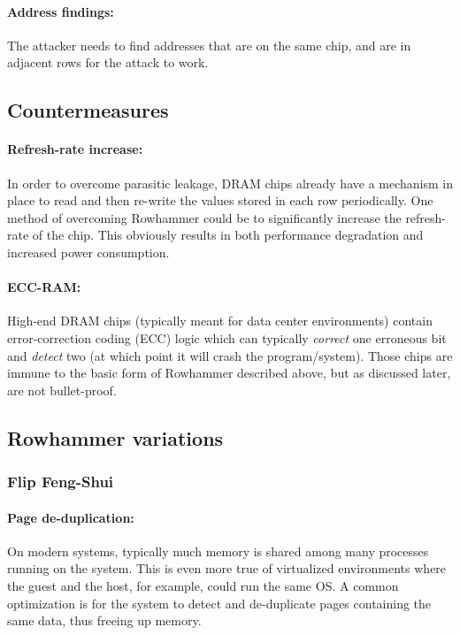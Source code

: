 \paragraph{Address findings:} The attacker needs to find
addresses that are on the same chip, and are in adjacent rows
for the attack to work.

\subsection{Countermeasures}\label{subsec:countermeasures}
\paragraph{Refresh-rate increase:} In order to overcome parasitic leakage, DRAM
chips already have a mechanism in place to read and then re-write the values
stored in each row periodically. One method of overcoming Rowhammer could be to
significantly increase the refresh-rate of the chip. This obviously results in
both performance degradation and increased power consumption.

\paragraph{ECC-RAM:} High-end DRAM chips (typically meant for data center
environments) contain error-correction coding (ECC) logic which can typically
\emph{correct} one erroneous bit and \emph{detect} two (at which point it will
crash the program/system). Those chips are immune to the basic form of Rowhammer
described above, but as discussed later, are not bullet-proof.

\subsection{Rowhammer variations}\label{subsec:rowhammer_variations}
\subsubsection{Flip Feng-Shui}\label{subsubsec:flip_feng_shui}
\paragraph{Page de-duplication:} On modern systems, typically much memory is
shared among many processes running on the system. This is even more true of
virtualized environments where the guest and the host, for example, could run
the same OS\@. A common optimization is for the system to detect and
de-duplicate pages containing the same data, thus freeing up memory.
